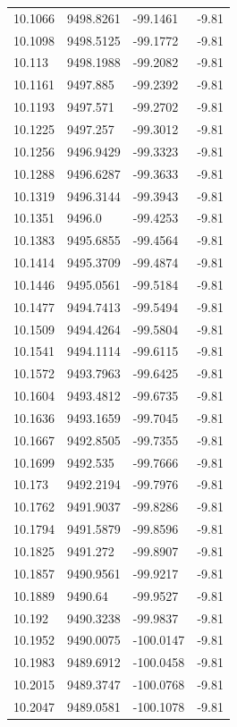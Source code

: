 \begin{table}[H]
\begin{tabular}{llll}
10.1066 & 9498.8261 & -99.1461 & -9.81 \\
10.1098 & 9498.5125 & -99.1772 & -9.81 \\
10.113 & 9498.1988 & -99.2082 & -9.81 \\
10.1161 & 9497.885 & -99.2392 & -9.81 \\
10.1193 & 9497.571 & -99.2702 & -9.81 \\
10.1225 & 9497.257 & -99.3012 & -9.81 \\
10.1256 & 9496.9429 & -99.3323 & -9.81 \\
10.1288 & 9496.6287 & -99.3633 & -9.81 \\
10.1319 & 9496.3144 & -99.3943 & -9.81 \\
10.1351 & 9496.0 & -99.4253 & -9.81 \\
10.1383 & 9495.6855 & -99.4564 & -9.81 \\
10.1414 & 9495.3709 & -99.4874 & -9.81 \\
10.1446 & 9495.0561 & -99.5184 & -9.81 \\
10.1477 & 9494.7413 & -99.5494 & -9.81 \\
10.1509 & 9494.4264 & -99.5804 & -9.81 \\
10.1541 & 9494.1114 & -99.6115 & -9.81 \\
10.1572 & 9493.7963 & -99.6425 & -9.81 \\
10.1604 & 9493.4812 & -99.6735 & -9.81 \\
10.1636 & 9493.1659 & -99.7045 & -9.81 \\
10.1667 & 9492.8505 & -99.7355 & -9.81 \\
10.1699 & 9492.535 & -99.7666 & -9.81 \\
10.173 & 9492.2194 & -99.7976 & -9.81 \\
10.1762 & 9491.9037 & -99.8286 & -9.81 \\
10.1794 & 9491.5879 & -99.8596 & -9.81 \\
10.1825 & 9491.272 & -99.8907 & -9.81 \\
10.1857 & 9490.9561 & -99.9217 & -9.81 \\
10.1889 & 9490.64 & -99.9527 & -9.81 \\
10.192 & 9490.3238 & -99.9837 & -9.81 \\
10.1952 & 9490.0075 & -100.0147 & -9.81 \\
10.1983 & 9489.6912 & -100.0458 & -9.81 \\
10.2015 & 9489.3747 & -100.0768 & -9.81 \\
10.2047 & 9489.0581 & -100.1078 & -9.81 \\

\end{tabular}
\end{table}
